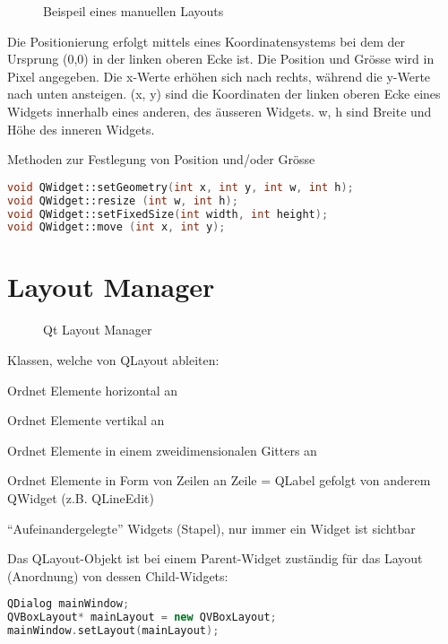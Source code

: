 \begin{figure}[ht]
    \centering
    \caption[]{Beispeil eines manuellen Layouts}
\end{figure}

Die Positionierung erfolgt mittels eines Koordinatensystems bei dem der Ursprung (0,0) in der linken oberen Ecke ist. Die Position und Grösse wird in Pixel angegeben. Die x-Werte erhöhen sich nach rechts, während die y-Werte nach unten ansteigen. (x, y) sind die Koordinaten der linken oberen Ecke eines Widgets innerhalb eines anderen, des äusseren Widgets. w, h sind Breite und Höhe des inneren Widgets.

Methoden zur Festlegung von Position und/oder Grösse
\begin{lstlisting}[language=c++]
void QWidget::setGeometry(int x, int y, int w, int h);
void QWidget::resize (int w, int h);
void QWidget::setFixedSize(int width, int height);
void QWidget::move (int x, int y);
\end{lstlisting}

\section{Layout Manager}
\begin{figure}[ht]
    \centering
    \caption[]{Qt Layout Manager}
\end{figure}

\noindent Klassen, welche von QLayout ableiten:
\begin{description}[leftmargin=*, widest={\textbf{\texttt{QStackedLayout}}}]
    \item[\texttt{QHBoxLayout}] Ordnet Elemente horizontal an
    \item[\texttt{QVBoxLayout}] Ordnet Elemente vertikal an
    \item[\texttt{QGridLayout}] Ordnet Elemente in einem zweidimensionalen Gitters an
    \item[\texttt{QFormLayout}] Ordnet Elemente in Form von Zeilen an Zeile = QLabel gefolgt von anderem QWidget (z.B. QLineEdit)
    \item[\texttt{QStackedLayout}] ``Aufeinandergelegte'' Widgets (Stapel), nur immer ein Widget ist sichtbar
\end{description}

Das QLayout-Objekt ist bei einem Parent-Widget zuständig für das Layout (Anordnung) von dessen Child-Widgets:
\begin{lstlisting}[language=c++]
QDialog mainWindow;
QVBoxLayout* mainLayout = new QVBoxLayout;
mainWindow.setLayout(mainLayout);
\end{lstlisting}


